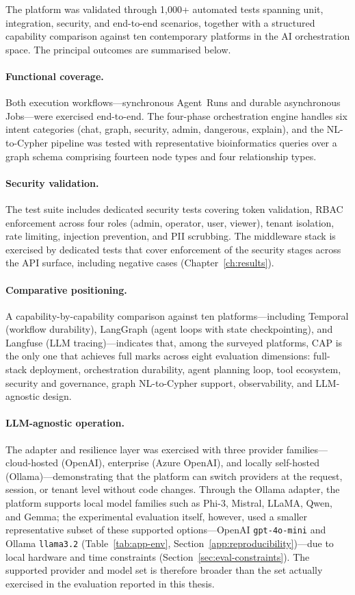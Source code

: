 \documentclass[a4paper,noexaminfo]{sapthesis}
\newcommand{\TestCount}{1,000+}
\begin{document}
The platform was validated through \TestCount{} automated tests
spanning unit, integration, security, and end-to-end scenarios, together
with a structured capability comparison against ten contemporary platforms
in the AI orchestration space.  The principal outcomes are summarised below.

\paragraph{Functional coverage.}
Both execution workflows---synchronous Agent~Runs and durable
asynchronous Jobs---were exercised end-to-end.  The four-phase
orchestration engine handles six intent categories (chat, graph,
security, admin, dangerous, explain), and the NL-to-Cypher pipeline
was tested with representative bioinformatics queries over a graph
schema comprising fourteen node types and four relationship types.

\paragraph{Security validation.}
The test suite includes dedicated security tests covering token
validation, RBAC enforcement across four roles (admin, operator, user,
viewer), tenant isolation, rate limiting, injection prevention, and PII
scrubbing.  The middleware stack is exercised by dedicated tests
that cover enforcement of the security stages across the API surface,
including negative cases (Chapter~\ref{ch:results}).

\paragraph{Comparative positioning.}
A capability-by-capability comparison against ten platforms---including
Temporal (workflow durability), LangGraph (agent loops with state
checkpointing), and Langfuse (LLM tracing)---indicates that, among the
surveyed platforms, CAP is the only one that achieves full marks across
eight evaluation dimensions: full-stack deployment, orchestration
durability, agent planning loop, tool ecosystem, security and governance,
graph NL-to-Cypher support, observability, and LLM-agnostic design.

\paragraph{LLM-agnostic operation.}
The adapter and resilience layer was exercised with three provider
families---cloud-hosted (OpenAI), enterprise (Azure OpenAI), and locally
self-hosted (Ollama)---demonstrating that the platform can switch
providers at the request, session, or tenant level without code changes.
Through the Ollama adapter, the platform supports local model families
such as Phi-3, Mistral, LLaMA, Qwen, and Gemma; the experimental
evaluation itself, however, used a smaller representative subset of
these supported options---OpenAI \texttt{gpt-4o-mini} and Ollama
\texttt{llama3.2}
(Table~\ref{tab:app-env}, Section~\ref{app:reproducibility})---due to
local hardware and time constraints (Section~\ref{sec:eval-constraints}).
The supported provider and model set is therefore broader than the set
actually exercised in the evaluation reported in this thesis.
\end{document}
